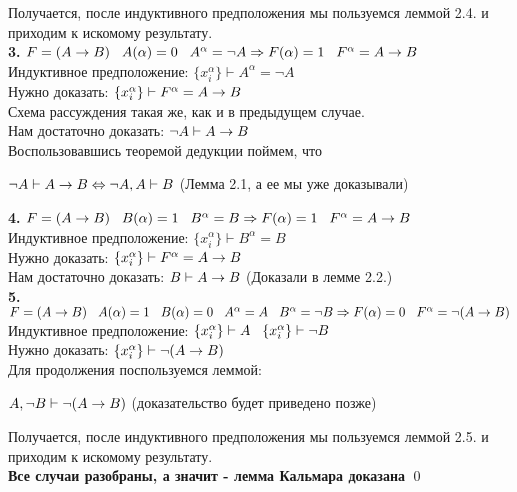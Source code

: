 Получается, после индуктивного предположения мы пользуемся леммой 2.4. и приходим к искомому результату.\\
\newline
\textbf{3.} $F = (A \rightarrow B) \hspace{3mm} A(\alpha) = 0 \hspace{3mm} A^{\alpha} = \neg A \Rightarrow F(\alpha) = 1 \hspace{3mm} F^{\alpha} = A \rightarrow B$\\
Индуктивное предположение: $\{x_i^{\alpha}\}\vdash A^{\alpha} =  \neg A$\\
Нужно доказать: $\{x_i^{\alpha}\}\vdash F^{\alpha} = A \rightarrow B$\\
Схема рассуждения такая же, как и в предыдущем случае. \\
Нам достаточно доказать: $\neg A \vdash A \rightarrow B$\\
Воспользовавшись теоремой дедукции поймем, что 
\begin{center}
    $\neg A \vdash A \rightarrow B \Leftrightarrow \neg A , A \vdash B$ (Лемма 2.1, а ее мы уже доказывали)
\end{center}
\textbf{4.} $F = (A \rightarrow B) \hspace{3mm} B(\alpha) = 1 \hspace{3mm} B^{\alpha} = B \Rightarrow F(\alpha) = 1 \hspace{3mm} F^{\alpha} = A \rightarrow B$\\
Индуктивное предположение: $\{x_i^{\alpha}\}\vdash B^{\alpha} = B$\\
Нужно доказать: $\{x_i^{\alpha}\}\vdash F^{\alpha} = A \rightarrow B$\\
Нам достаточно доказать: $B \vdash A \rightarrow B$ (Доказали в лемме 2.2.)\\

\textbf{5.} $F = (A \rightarrow B) \hspace{3mm} A(\alpha) = 1 \hspace{3mm} B(\alpha) = 0 \hspace{3mm} A^{\alpha} = A \hspace{3mm} B^{\alpha} = \neg B \Rightarrow F(\alpha) = 0 \hspace{3mm} F^{\alpha} = \neg (A \rightarrow B)$\\
Индуктивное предположение: $\{x_i^{\alpha}\}\vdash A \hspace{3mm} \{x_i^{\alpha}\}\vdash \neg B  $\\
Нужно доказать: $\{x_i^{\alpha}\}\vdash \neg (A\rightarrow B)$\\
Для продолжения поспользуемся леммой:
\begin{lemma}
$A, \neg B \vdash \neg (A\rightarrow B)$ (доказательство будет приведено позже)
\end{lemma}
Получается, после индуктивного предположения мы пользуемся леммой 2.5. и приходим к искомому результату.\\
\textbf{Все случаи разобраны, а значит - лемма Кальмара доказана}
\qed


